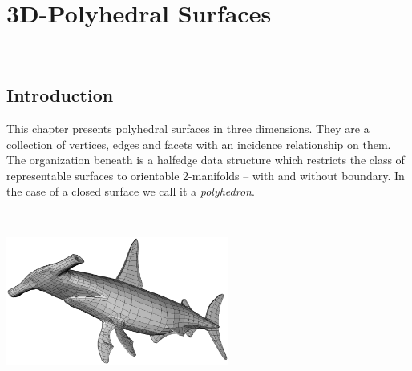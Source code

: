 
\ccParDims

\chapter{3D-Polyhedral Surfaces}
\label{chapterPolyhedron}
\\


\section{Introduction}

This chapter presents polyhedral surfaces in three dimensions. They
are a collection of vertices, edges and facets with an incidence
relationship on them. The organization beneath is a halfedge data
structure which restricts the class of representable surfaces to
orientable 2-manifolds -- with and without boundary. In the case of a
closed surface we call it a {\em polyhedron}.

\begin{ccTexOnly}
    \begin{center}~\hspace{5cm}
      \parbox{0.55\textwidth}{%
          \includegraphics[width=0.55\textwidth]{idraw/shark.ps}%
      }
    \end{center}
    \vspace*{-16mm}
\end{ccTexOnly}

